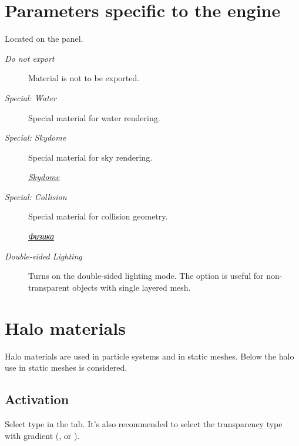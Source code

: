 \documentclass[a4paper,12pt,oneside]{sphinxmanual}
\begin{document}

\section{Parameters specific to the engine}
\label{materials:id13}\label{materials:index-9}
Located on the  panel.
\begin{description}
\item[{\emph{Do not export}}] \leavevmode
Material is not to be exported.

\item[{\emph{Special: Water}}] \leavevmode
Special material for water rendering.

\item[{\emph{Special: Skydome}}] \leavevmode
Special material for sky rendering.




{\hyperref[textures:skydome-texture]{\emph{Skydome}}}



\item[{\emph{Special: Collision}}] \leavevmode
Special material for collision geometry.




{\hyperref[physics:physics]{\emph{Физика}}}



\item[{\emph{Double-sided Lighting}}] \leavevmode
Turns on the double-sided lighting mode. The option is useful for non-transparent objects with single layered mesh.

\end{description}


\section{Halo materials}
\label{materials:material-halo}\label{materials:index-10}\label{materials:halo}
Halo materials are used in particle systems and in static meshes. Below the halo use in static meshes is considered.


\subsection{Activation}
\label{materials:id14}
Select  type in the  tab. It's also recommended to select the transparency type with gradient (,  or ).
\end{document}
